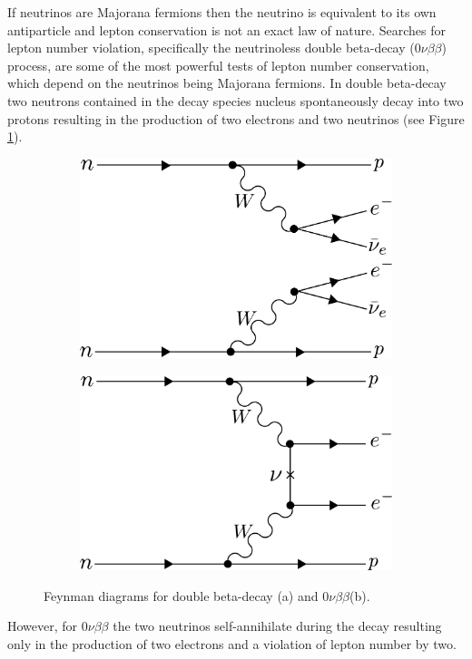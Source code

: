 If neutrinos are Majorana fermions then the neutrino is equivalent to its own antiparticle and lepton conservation is not an exact law of nature. Searches for lepton number violation, specifically the neutrinoless double beta-decay ($0\nu\beta\beta$) process, are some of the most powerful tests of lepton number conservation, which depend on the neutrinos being Majorana fermions. In double beta-decay two neutrons contained in the decay species nucleus spontaneously decay into two protons resulting in the production of two electrons and two neutrinos (see Figure \ref{fig:chap2-0nubetabeta-diagram}).  
\begin{figure}[htbp]
    \centering
    \begin{subfigure}{0.4\textwidth}
        \includegraphics*[width=\textwidth]{figs/Chapter-2/230717_2nubetabeta.png}
        \caption{}
    \end{subfigure}
    \begin{subfigure}{0.4\textwidth}
        \includegraphics*[width=\textwidth]{figs/Chapter-2/230717_0nubetabeta.png}
        \caption{}
    \end{subfigure}
    \caption{\label{fig:chap2-0nubetabeta-diagram} Feynman diagrams for double beta-decay (a) and $0\nu\beta\beta$(b).}
\end{figure}
However, for $0\nu\beta\beta$ the two neutrinos self-annihilate during the decay resulting only in the production of two electrons and a violation of lepton number by two. 


